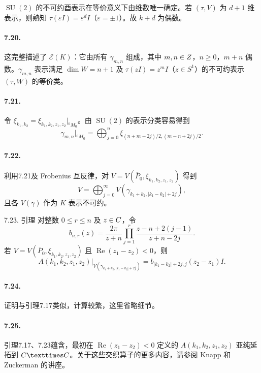 $\operatorname{SU}(2)$ 的不可约酉表示在等价意义下由维数唯一确定。若 $(\tau,V)$ 为 $d+1$ 维表示，则熟知 $\tau(\varepsilon I)=\varepsilon^dI$（$\varepsilon=\pm1$）。故 $k+d$ 为偶数。
\paragraph*{7.20.} 这完整描述了 $\mathcal E(K)$：它由所有 $\gamma_{m,n}$ 组成，其中 $m,n\in Z$，$n\ge0$，$m+n$ 偶数。$\gamma_{m,n}$ 表示满足 $\dim W=n+1$ 及 $\tau(zI)=z^mI$（$z\in S^1$）的不可约表示 $(\tau,W)$ 的等价类。
\paragraph*{7.21.} 令 $\xi_{k_1,k_2}=\xi_{k_1,k_2,z_1,z_2}|_{{}^0M_0}$。由 $\operatorname{SU}(2)$ 的表示分类容易得到
\[
 \gamma_{m,n}|_{{}^0M_0}=\bigoplus_{j=0}^n
 \xi_{(n+m-2j)/2,(m-n+2j)/2}.
\]
\paragraph*{7.22.} 利用7.21及 Frobenius 互反律，对 $V=V(\overline P_0,\xi_{k_1,k_2,z_1,z_2})$ 得到
\[
 V=\bigoplus_{j=0}^\infty V(\gamma_{k_1+k_2,|k_1-k_2|+2j}),
\]
且各 $V(\gamma)$ 作为 $K$ 表示不可约。
\begin{originaltheorem}{7.23. 引理}
对整数 $0\le r\le n$ 及 $z\in C$，令
\[
 b_{n,r}(z)=\frac{2\pi}{z+n}\prod_{j=1}^r\frac{z-n+2(j-1)}{z+n-2j}.
\]
若 $V=V(\overline P_0,\xi_{k_1,k_2,z_1,z_2})$ 且 $\operatorname{Re}(z_1-z_2)<0$，则
\[
 A(k_1,k_2,z_1,z_2)|_{V(\gamma_{k_1+k_2,|k_1-k_2|+2j})}
 =b_{|k_1-k_2|+2j,j}(z_2-z_1)I.
\]
\end{originaltheorem}
\paragraph*{7.24.} 证明与引理7.17类似，计算较繁，这里省略细节。
\paragraph*{7.25.} 引理7.17、7.23蕴含，最初在 $\operatorname{Re}(z_1-z_2)<0$ 定义的 $A(k_1,k_2,z_1,z_2)$ 亚纯延拓到 $\C\times\C$。关于这些交织算子的更多内容，请参阅 Knapp 和 Zuckerman 的讲座。

